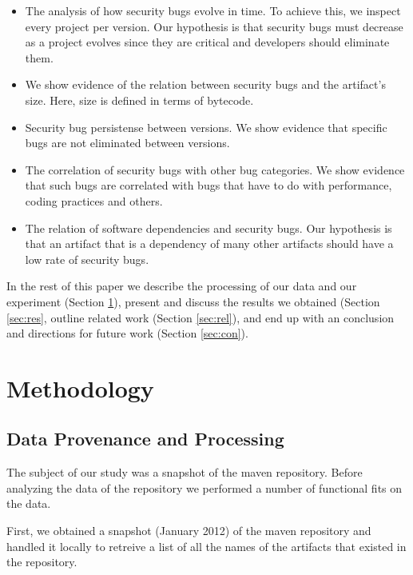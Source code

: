 \documentclass[conference]{IEEEtran}
\begin{document}
\begin{itemize}
	\item The analysis of how security bugs evolve in time. To achieve
this, we inspect every project per version. Our hypothesis is that security
bugs must decrease as a project evolves since they are critical and developers
should eliminate them.
	\item We show evidence of the relation between security bugs and the artifact's size.  Here, size is
defined in terms of bytecode.
	\item Security bug persistense between versions. We show evidence that specific bugs are
not eliminated between versions.
	\item The correlation of security bugs with other bug categories. We
show evidence that such bugs are correlated with bugs that have to do with
performance, coding practices and others.
	\item The relation of software dependencies and security bugs. Our
hypothesis is that an artifact that is a dependency of many other artifacts
should have a low rate of security bugs. 
\end{itemize}

In the rest of this paper we
describe the processing of our data and our experiment (Section \ref{sec:meth}),
present and discuss the results we obtained (Section \ref{sec:res},
outline related work (Section \ref{sec:rel}),
and end up with an conclusion and directions for future work (Section \ref{sec:con}).

\section{Methodology}
\label{sec:meth}

\subsection{Data Provenance and Processing}
\label{sec:data}

The subject of our study was a snapshot of the maven repository. Before
analyzing the data of the repository we performed a number of functional fits
on the data.

First, we obtained a snapshot (January 2012) of the maven repository and
handled it locally to retreive a list of all the names of the artifacts that existed in the
repository.
\end{document}

